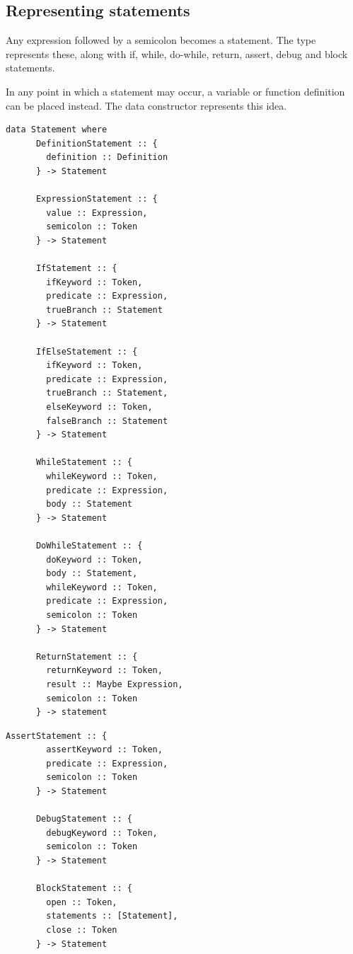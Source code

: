 \documentclass[UdineBachThesis,american,11pt]{PhdThesis}
\begin{document}
  \subsection{Representing statements}

  Any expression followed by a semicolon becomes a statement. The type
  \lstinline@Statement@ represents these, along with if, while, do-while,
  return, assert, debug and block statements.

  In any point in which a statement may occur, a variable or function definition
  can be placed instead. The data constructor \lstinline@DefinitionStatement@
  represents this idea.

  \begin{lstlisting}[gobble=4,basicstyle=\ttfamily\small]
    data Statement where
      DefinitionStatement :: {
        definition :: Definition
      } -> Statement

      ExpressionStatement :: {
        value :: Expression,
        semicolon :: Token
      } -> Statement

      IfStatement :: {
        ifKeyword :: Token,
        predicate :: Expression,
        trueBranch :: Statement
      } -> Statement

      IfElseStatement :: {
        ifKeyword :: Token,
        predicate :: Expression,
        trueBranch :: Statement,
        elseKeyword :: Token,
        falseBranch :: Statement
      } -> Statement

      WhileStatement :: {
        whileKeyword :: Token,
        predicate :: Expression,
        body :: Statement
      } -> Statement

      DoWhileStatement :: {
        doKeyword :: Token,
        body :: Statement,
        whileKeyword :: Token,
        predicate :: Expression,
        semicolon :: Token
      } -> Statement

      ReturnStatement :: {
        returnKeyword :: Token,
        result :: Maybe Expression,
        semicolon :: Token
      } -> statement
  \end{lstlisting}

  \newpage

  \begin{lstlisting}[gobble=4,basicstyle=\ttfamily\small]
      AssertStatement :: {
        assertKeyword :: Token,
        predicate :: Expression,
        semicolon :: Token
      } -> Statement

      DebugStatement :: {
        debugKeyword :: Token,
        semicolon :: Token
      } -> Statement

      BlockStatement :: {
        open :: Token,
        statements :: [Statement],
        close :: Token
      } -> Statement
  \end{lstlisting}
\end{document}
